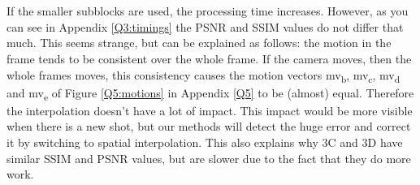 \section[Evaluate the performance of the different sub-macroblock sizes for error conceal-
ment and compare this with the results for an adaptive sub-macroblock conceal-
ment method (Exercise 3.D). Perform an evaluation of the objective and subjective
quality.]{}

If the smaller subblocks are used, the processing time increases. However, as you can see in Appendix \ref{Q3:timings} the PSNR and SSIM values do not differ that much. This seems strange, but can be explained as follows: the motion in the frame tends to be consistent over the whole frame. If the camera moves, then the whole frames moves, this consistency causes the motion vectors mv\textsubscript{b}, mv\textsubscript{c}, mv\textsubscript{d} and mv\textsubscript{e} of Figure \ref{Q5:motions} in Appendix \ref{Q5} to be (almost) equal. Therefore the interpolation doesn't have a lot of impact. This impact would be more visible when there is a new shot, but our methods will detect the huge error and correct it by switching to spatial interpolation. This also explains why 3C and 3D have similar SSIM and PSNR values, but are slower due to the fact that they do more work.